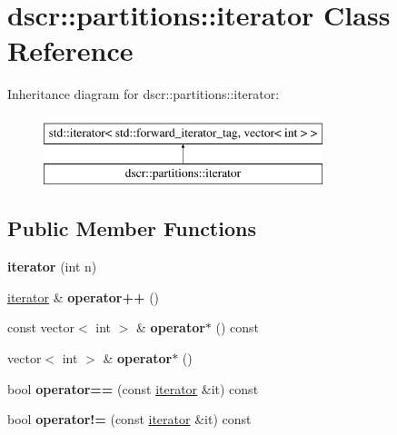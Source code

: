 \hypertarget{classdscr_1_1partitions_1_1iterator}{\section{dscr\-:\-:partitions\-:\-:iterator Class Reference}
\label{classdscr_1_1partitions_1_1iterator}
}
Inheritance diagram for dscr\-:\-:partitions\-:\-:iterator\-:\begin{figure}[H]
\begin{center}
\leavevmode
\includegraphics[height=2.000000cm]{classdscr_1_1partitions_1_1iterator}
\end{center}
\end{figure}
\subsection*{Public Member Functions}
\begin{DoxyCompactItemize}
\item 
\hypertarget{classdscr_1_1partitions_1_1iterator_a5e3758d1e0bb968ee8e0078191757e68}{{\bfseries iterator} (int n)}\label{classdscr_1_1partitions_1_1iterator_a5e3758d1e0bb968ee8e0078191757e68}

\item 
\hypertarget{classdscr_1_1partitions_1_1iterator_a8e8398022469f5c0b66dee585112373a}{\hyperlink{classdscr_1_1partitions_1_1iterator}{iterator} \& {\bfseries operator++} ()}\label{classdscr_1_1partitions_1_1iterator_a8e8398022469f5c0b66dee585112373a}

\item 
\hypertarget{classdscr_1_1partitions_1_1iterator_a45db5aabb5b36a54c34b08154d91eec5}{const vector$<$ int $>$ \& {\bfseries operator$\ast$} () const }\label{classdscr_1_1partitions_1_1iterator_a45db5aabb5b36a54c34b08154d91eec5}

\item 
\hypertarget{classdscr_1_1partitions_1_1iterator_a29cd1ef3ed577d839afc3f6520689073}{vector$<$ int $>$ \& {\bfseries operator$\ast$} ()}\label{classdscr_1_1partitions_1_1iterator_a29cd1ef3ed577d839afc3f6520689073}

\item 
\hypertarget{classdscr_1_1partitions_1_1iterator_a958ef45b87d49650f371b1fb88dce324}{bool {\bfseries operator==} (const \hyperlink{classdscr_1_1partitions_1_1iterator}{iterator} \&it) const }\label{classdscr_1_1partitions_1_1iterator_a958ef45b87d49650f371b1fb88dce324}

\item 
\hypertarget{classdscr_1_1partitions_1_1iterator_a610a50863ff911273142ce97819ae7a6}{bool {\bfseries operator!=} (const \hyperlink{classdscr_1_1partitions_1_1iterator}{iterator} \&it) const }\label{classdscr_1_1partitions_1_1iterator_a610a50863ff911273142ce97819ae7a6}

\end{DoxyCompactItemize}
